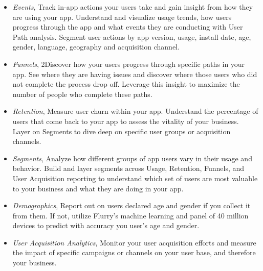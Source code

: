 \begin{itemize}
\item \textit{Events}, Track in-app actions your users take and gain insight from how they are using your app. Understand and visualize usage trends, how users progress through the app and what events they are conducting with User Path analysis. Segment user actions by app version, usage, install date, age, gender, language, geography and acquisition channel.
\item \textit{Funnels}, 2Discover how your users progress through specific paths in your app. See where they are having issues and discover where those users who did not complete the process drop off. Leverage this insight to maximize the number of people who complete these paths.
\item \textit{Retention}, Measure user churn within your app. Understand the percentage of users that come back to your app to assess the vitality of your business. Layer on Segments to dive deep on specific user groups or acquisition channels.
\item \textit{Segments}, Analyze how different groups of app users vary in their usage and behavior. Build and layer segments across Usage, Retention, Funnels, and User Acquisition reporting to understand which set of users are most valuable to your business and what they are doing in your app.
\item \textit{Demographics}, Report out on users declared age and gender if you collect it from them. If not, utilize Flurry’s machine learning and panel of 40 million devices to predict with accuracy you user’s age and gender.
\item \textit{User Acquisition Analytics}, Monitor your user acquisition efforts and measure the impact of specific campaigns or channels on your user base, and therefore your business.
\end{itemize}

